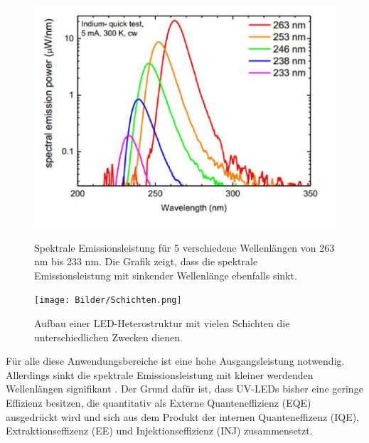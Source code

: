 \begin{figure}[htb]
    \centering
    \begin{minipage}[t]{0.49\linewidth}
        \centering
        \includegraphics[width=\linewidth]{Bilder/SpectralEmissionPower_Wavelength.png}
        \caption{Spektrale Emissionsleistung für 5 verschiedene Wellenlängen von 263 nm bis 233 nm. Die Grafik zeigt, dass die spektrale Emissionsleistung mit sinkender Wellenlänge ebenfalls sinkt\cite{semreich}.}
        \label{fig:specPowWVL}
    \end{minipage}
    \hfill
    \begin{minipage}[t]{0.49\linewidth}
        \centering
        \texttt{[image: Bilder/Schichten.png]}
        \caption{Aufbau einer LED-Heterostruktur mit vielen Schichten die unterschiedlichen Zwecken dienen.}
        \label{fig:schichtenLED}
    \end{minipage}
\end{figure}
\noindent
%
\fi
\newline
Für alle diese Anwendungsbereiche ist eine hohe Ausgangsleistung notwendig. Allerdings sinkt die spektrale Emissionsleistung mit kleiner werdenden Wellenlängen signifikant \cite{0268-1242-26-1-014036}. Der Grund dafür ist, dass UV-LEDs bisher eine geringe Effizienz besitzen, die quantitativ als Externe Quanteneffizienz (EQE) ausgedrückt wird und sich aus dem Produkt der internen Quanteneffizenz (IQE), Extraktionseffizenz (EE) und Injektionseffizienz (INJ) zusammensetzt.

\newline
